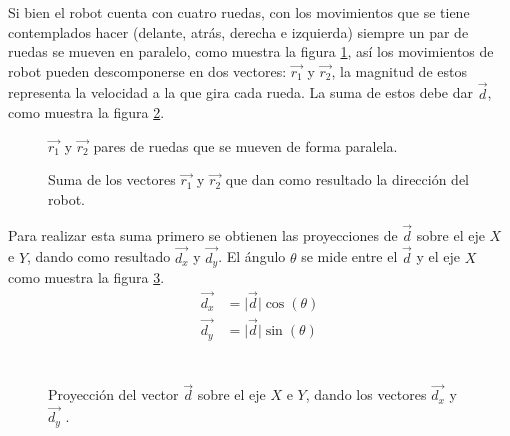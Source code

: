 \documentclass{iccmemoria}
\begin{document}
Si bien el robot cuenta con cuatro ruedas, con los movimientos que se tiene contemplados hacer (delante, atrás, derecha e izquierda) siempre un par de ruedas se mueven en paralelo, como muestra la figura \ref{fig:omni_vector}, así los movimientos de robot pueden descomponerse en dos vectores: $\vec{r_{1}}$ y $\vec{r_{2}}$, la magnitud de estos representa la velocidad a la que gira cada rueda. La suma de estos debe dar $\vec{d}$, como muestra la figura \ref{fig:vec_sum}.\\

\begin{figure}[H]
  \centering
  \begin{large}
  
  \end{large}
  \caption[Movimiento de las ruedas del robot omnidireccional.]{$\vec{r_{1}}$ y $\vec{r_{2}}$ pares de ruedas que se mueven de forma paralela.}
  \label{fig:omni_vector}
\end{figure}

\begin{figure}[H]
  \centering
  \begin{large}
  
  \end{large}
  \caption[Suma de los vectores que dan la dirección del robot.]{Suma de los vectores $\vec{r_{1}}$ y $\vec{r_{2}}$ que dan como resultado la dirección del robot.}
  \label{fig:vec_sum}
\end{figure}

Para realizar esta suma primero se obtienen las proyecciones de $\vec{d}$ sobre el eje $X$ e $Y$, dando como resultado $\vec{d_{x}}$ y $\vec{d_{y}}$. El ángulo $\theta$ se mide entre el $\vec{d}$ y el eje $X$ como muestra la figura \ref{fig:vec_proyection}.\\

\begin{equation}
	\begin{split}
	\vec{d_{x}} & = \lvert \vec{d} \rvert \cos(\theta)\\
	\vec{d_{y}} & = \lvert \vec{d} \rvert \sin(\theta)\\
	\end{split}
\end{equation}\\

\begin{figure}[H]
  \centering
  \begin{large}
  
  \end{large}
  \caption[Proyección del vector $\vec{d}$ sobre el eje $X$ e $Y$.]{Proyección del vector $\vec{d}$ sobre el eje $X$ e $Y$, dando los vectores $\vec{d_{x}}$ y $\vec{d_{y}}$ .}
  \label{fig:vec_proyection}
\end{figure}
\end{document}
